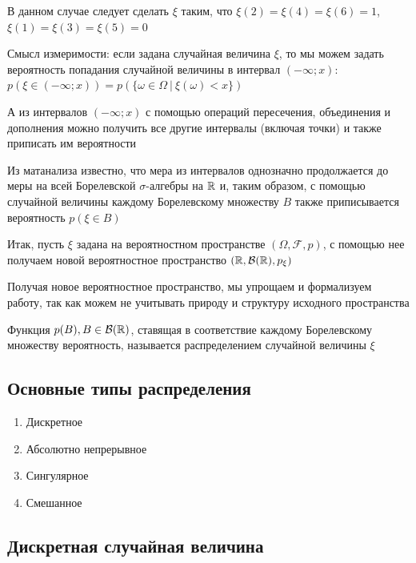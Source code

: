 \documentclass[12pt]{article}
\begin{document}
    В данном случае следует сделать $\xi$ таким, что $\xi(2) = \xi(4) = \xi(6) = 1$, $\xi(1) = \xi(3) = \xi(5) = 0$

    \Nota Смысл измеримости: если задана случайная величина $\xi$, то мы можем задать вероятность попадания случайной
    величины в интервал $(-\infty; x)$: $p(\xi \in (-\infty; x)) = p(\{\omega \in \Omega \ | \ \xi(\omega) < x\})$

    А из интервалов $(-\infty; x)$ с помощью операций пересечения, объединения и дополнения можно получить все другие
    интервалы (включая точки) и также приписать им вероятности

    Из матанализа известно, что мера из интервалов однозначно продолжается до меры на всей Борелевской $\sigma$-алгебры на $\mathbb{R}$
    и, таким образом, с помощью случайной величины каждому Борелевскому множеству $B$ также приписывается вероятность $p(\xi \in B)$

    \hypertarget{probabilityspacerbp}{}

    Итак, пусть $\xi$ задана на вероятностном пространстве $(\Omega, \mathcal{F}, p)$, с помощью нее получаем новой вероятностное
    пространство $(\mathbb{R}, \mathcal{B}(\mathbb{R}), p_\xi)$

    Получая новое вероятностное пространство, мы упрощаем и формализуем работу, так как можем не учитывать природу и структуру исходного пространства

    \hypertarget{randomvaluedistribution}{}

    \Def Функция $p(B), B \in \mathcal{B}(\mathbb{R})$, ставящая в соответствие каждому Борелевскому множеству вероятность,
    называется распределением случайной величины $\xi$

    \subsection{Основные типы распределения}

    \begin{enumerate}[label=\alph*) ]
        \item Дискретное

        \item Абсолютно непрерывное

        \item Сингулярное

        \item Смешанное
    \end{enumerate}

    \subsection{Дискретная случайная величина}
\end{document}

